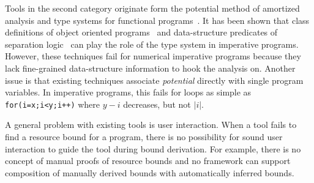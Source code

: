 \documentclass[nocopyrightspace,preprint,pldi]{sigplanconf-pldi15}
\begin{document}
Tools in the second category originate form the potential method of
amortized analysis and type systems for functional
programs~\cite{Jost03,HoffmannAH12}. It has been shown that class
definitions of object oriented programs~\cite{Jost06} and
data-structure predicates of separation logic~\cite{Atkey10} can play
the role of the type system in imperative programs. However, these
techniques fail for numerical imperative programs because they lack
fine-grained data-structure information to hook the analysis on.
Another issue is that existing techniques associate \emph{potential}
directly with single program variables.  In imperative programs, this
fails for loops as simple as \lstinline{for(i=x;i<y;i++)} where
$y - i$ decreases, but not $|i|$. %

A general problem with existing tools is user interaction. When a tool
fails to find a resource bound for a program, there is no possibility
for sound user interaction to guide the tool during bound
derivation.
For example, there is no concept of manual proofs of
resource bounds and no framework can support composition
of manually derived bounds with automatically inferred bounds.

\end{document}
